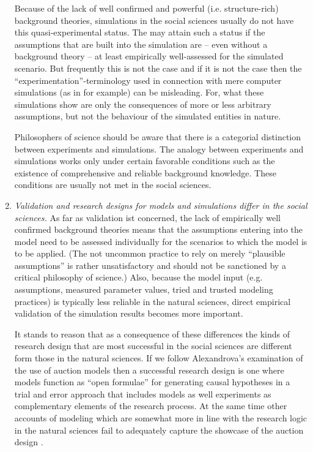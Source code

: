 \documentclass[onecollarge]{STJour}
\numberwithin{equation}{section}
\begin{document}
\begin{enumerate}
  Because of the lack of well confirmed and powerful (i.e.
  structure-rich) background theories, simulations in the social sciences
  usually do not have this quasi-experimental status. The may attain such
  a status if the assumptions that are built into the simulation are --
  even without a background theory -- at least empirically well-assessed
  for the simulated scenario. But frequently this is not the case and if
  it is not the case then the ``experimentation''-terminology used in
  connection with mere computer simulations (as in
  \citep[3.11]{hegselmann-flache:1998} for example) can be misleading.
  For, what these simulations show are only the consequences of more or
  less arbitrary assumptions, but not the behaviour of the simulated
  entities in nature.
  
  Philosophers of science should be aware that there is a categorial
  distinction between experiments and simulations. The analogy between
  experiments and simulations works only under certain favorable
  conditions such as the existence of comprehensive and reliable
  background knowledge. These conditions are usually not met in the
  social sciences.

  \item {\em Validation and research designs for models and simulations
  differ in the social sciences.} As far as validation ist concerned, the
  lack of empirically well confirmed background theories means that the
  assumptions entering into the model need to be assessed individually
  for the scenarios to which the model is to be applied. (The not
  uncommon practice to rely on merely ``plausible assumptions'' is rather
  unsatisfactory and should not be sanctioned by a critical philosophy of
  science.) Also, because the model input (e.g. assumptions, measured
  parameter values, tried and trusted modeling practices) is typically
  less reliable in the natural sciences, direct empirical validation of
  the simulation results becomes more important.
  
  It stands to reason that as a consequence of these differences the
  kinds of research design that are most successful in the social
  sciences are different form those in the natural sciences. If we follow
  Alexandrova's examination of the use of auction models
  \citep{alexandrova:2008} then a successful research design is one where
  models function as ``open formulae'' for generating causal hypotheses
  in a trial and error approach that includes models as well experiments
  as complementary elements of the research process. At the same time
  other accounts of modeling which are somewhat more in line with the
  research logic in the natural sciences fail to adequately capture the
  showcase of the auction design \citep[p.\ 387-393]{alexandrova:2008}.
  

\end{enumerate}
\end{document}
